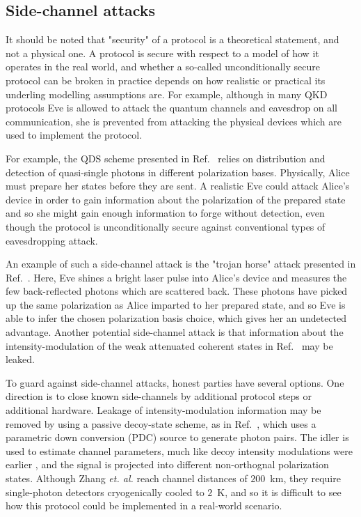 \subsection*{Side-channel attacks}
It should be noted that "security" of a protocol is a theoretical statement, and not a physical one. A protocol is secure with respect to a model of how it operates in the real world, and whether a so-called unconditionally secure protocol can be broken in practice depends on how realistic or practical its underling modelling assumptions are. For example, although in many QKD protocols Eve is allowed to attack the quantum channels and eavesdrop on all communication, she is prevented from attacking the physical devices which are used to implement the protocol. 

For example, the QDS scheme presented in Ref.~\cite{Amiri2016} relies on distribution and detection of quasi-single photons  in different polarization bases. Physically, Alice must prepare her states before they are sent. A realistic Eve could attack Alice's device in order to gain information about the polarization of the prepared state and so she might gain enough information to forge without detection, even though the protocol is unconditionally secure against conventional types of eavesdropping attack.

An example of such a side-channel attack  is the "trojan horse" attack presented in Ref.~\cite{Jain2014}. Here, Eve shines a bright laser pulse into Alice's device and measures the few back-reflected photons which are scattered back. These photons have picked up the same polarization as Alice imparted to her prepared state, and so Eve is able to infer the chosen polarization basis choice, which gives her an undetected advantage. Another potential side-channel attack is that information about the intensity-modulation of the weak attenuated coherent states in Ref.~\cite{Amiri2016, Yin2016c} may be leaked.



To guard against side-channel attacks, honest parties have several options. One direction is to close known side-channels by additional protocol steps or additional hardware. Leakage of intensity-modulation information may be removed by using a passive decoy-state scheme, as in Ref.~\cite{Zhang2018}, which uses a parametric down conversion (PDC) source to generate photon pairs. The idler is used to estimate channel parameters, much like decoy intensity modulations were earlier , and the signal is projected into different non-orthognal polarization states. Although Zhang \emph{et. al.} reach channel distances of $200$~km, they require single-photon detectors cryogenically cooled to $2$~K, and so it is difficult to see how this protocol could be implemented in a real-world scenario.


